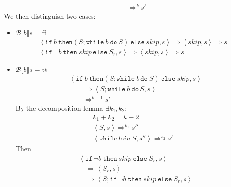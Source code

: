 \begin{exercise}
\begin{itemize}
\begin{itemize}
\begin{align*}
                    \\&\qquad\Rightarrow^k s'
                \end{align*}
                We then distinguish two cases:
                \begin{itemize}
                    \item $\mathcal{B} \llbracket b \rrbracket s = \text{ff}$
                    \begin{gather*}
                        \left<\texttt{if}\ b\ \texttt{then} (S; \texttt{while}\ b\ \texttt{do}\ S)\ \texttt{else}\ skip, s\right>
                        \Rightarrow
                        \left<skip, s\right>
                        \Rightarrow s
                        \\
                        \left<\texttt{if}\ \neg b\ \texttt{then}\ skip\ \texttt{else}\ S_r, s\right>
                        \Rightarrow
                        \left<skip, s\right>
                        \Rightarrow s
                    \end{gather*}
                    \item $\mathcal{B} \llbracket b \rrbracket s = \text{tt}$
                        \begin{align*}
                            &\left<\texttt{if}\ b\ \texttt{then} (S; \texttt{while}\ b\ \texttt{do}\ S)\ \texttt{else}\ skip, s\right>
                            \\&\qquad\Rightarrow \left<S; \texttt{while}\ b\ \texttt{do}\ S, s\right>
                            \\&\qquad\Rightarrow^{k-1} s'
                        \end{align*}
                        By the decomposition lemma $\exists k_1, k_2 :$
                        \begin{gather*}
                            k_1 + k_2 = k - 2 \\
                            \left<S, s\right> \Rightarrow^{k_1} s'' \\
                            \left<\texttt{while}\ b\ \texttt{do}\ S, s''\right> \Rightarrow^{k_2} s'
                        \end{gather*}
                        Then
                        \begin{align*}
                            &\left<\texttt{if}\ \neg b\ \texttt{then}\ skip\ \texttt{else}\ S_r, s\right>
                            \\&\quad\Rightarrow \left<S_r, s\right>
                            \\&\quad\Rightarrow \left<S; \texttt{if}\ \neg b\ \texttt{then}\ skip\ \texttt{else}\ S_r, s\right>

\end{align*}
\end{itemize}
\end{itemize}
\end{itemize}
\end{exercise}
